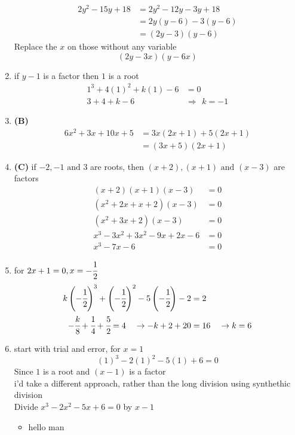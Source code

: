 \begin{multicols}{2}
\begin{enumerate}[label={\textbf{\arabic*.}}]
    \begin{align*}
    2y^2 - 15y + 18 &= 2y^2 -12y - 3y + 18  \\ 
    &= 2y(y-6) -3(y-6)  \\ 
    &= (2y-3)(y-6)
    \end{align*}
    Replace the $x$ on those without any variable 
    $$(2y-3x)(y-6x)$$
\item if $y-1$ is a factor then $1$ is a root 
    \begin{align*}
    1^3 + 4(1)^2 + k(1) - 6 &= 0 \\
    3+ 4 + k - 6 \hspace{5pt} &\Rightarrow \hspace{5pt} k = -1
    \end{align*}
    \item \textbf{(B)} 
    \begin{align*} 6x^2 + 3x + 10x + 5 &= 3x(2x + 1) + 5(2x+1) \\ &= (3x+5)(2x+1) \end{align*}
    \item \textbf{(C)} if $-2, -1 \text{ and } 3$ are roots, then $(x+2), (x+1) \text{ and } (x-3)$ are factors 
        \begin{align*} 
            (x+2)(x+1)(x-3) &= 0 \\
            (x^2 + 2x + x + 2)(x-3) &= 0 \\
            (x^2 + 3x + 2)(x-3) &= 0 \\
            x^3 - 3x^2 +3x^2 - 9x + 2x -6 & = 0 \\
            x^3 -7x -6 & = 0 
        \end{align*}
    \item for $2x+1 = 0, x = -\cfrac{1}{2}$ \\
    \begin{align*} 
        k\left(-\cfrac{1}{2}\right)^3 + \left(-\cfrac{1}{2}\right)^2 - 5\left(-\cfrac{1}{2}\right) - 2 &= 2 \\
         -\cfrac{k}{8} + \cfrac{1}{4}+ \cfrac{5}{2}  = 4\hspace{10pt} \rightarrow -k + 2 + 20 &= 16 \hspace{10pt} \rightarrow k = 6
    \end{align*}
\item start with trial and error, for $x = 1$ 
    $$(1)^3 - 2(1)^2-5(1) + 6 = 0 $$ Since $1$ is a root and $(x-1)$ is a factor \\
    i'd take a different approach, rather than the long division using synthethic division \\ Divide $x^3 - 2x^2 - 5x + 6 = 0$ by $x-1$
     \begin{itemize}
        \item  hello man
     \end{itemize}


\end{enumerate}
\end{multicols}
